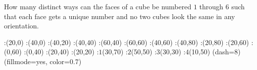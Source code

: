 
%
%
%
%
% 
% 

\question[6] How many distinct ways can the faces of a cube be numbered $1$ 
through $6$ such that each face gets a unique number and no two cubes look 
the same in any orientation.


\ifprintanswers
  \begin{marginfigure}
      :(20,0)
      :(40,0)
      :(40,20)
      :(40,40)
      :(60,40)
      :(60,60)
      :(40,60)
      :(40,80)
      :(20,80) 
      :(20,60)
      :(0,60)
      :(0,40)
      :(20,40)
      :(20,20)
      :$1$(30,70)
      :$2$(50,50)
      :$3$(30,30)
      :$4$(10,50)
    \figdrawbegin{}
      \figdrawline[100,101,102,103,104,105,106,107,108,109,110,111,112,113,100]
      \figset (dash=8)
      \figdrawline[103,106,109,112,103]
      \figset (fillmode=yes, color=0.7)
      \figdrawline[100,101,102,113,100]
    \figdrawend
    \centerline{\box\figBoxA}
  \end{marginfigure}
  
